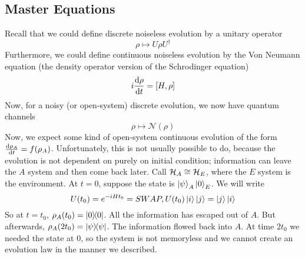 \subsection{Master Equations}
Recall that we could define discrete noiseless evolution by a unitary operator
\[ \rho \mapsto U \rho U^{\dagger} \]
Furthermore, we could define continuous noiseless evolution by the Von Neumann equation (the
density operator version of the Schrodinger equation)
\[ i \dv{\rho}{t} = [H, \rho] \]
Now, for a noisy (or open-system) discrete evolution, we now have quantum channels
\[ \rho \mapsto \mathcal{N}(\rho) \]
Now, we expect some kind of open-system continuous evolution of the form $\dv{\rho_A}{t} = f(\rho_A)$.
Unfortunately, this is not usually possible to do, because the evolution is not dependent on purely on initial condition;
information can leave the $A$ system and then come back later. Call $\operatorname{\mathcal{H}}_A \cong \operatorname{\mathcal{H}}_E$, where the $E$ system
is the environment. At $t = 0$, suppose the state is $\ket{\psi}_A \ket{0}_E$. We will write
\[ U(t_0) = e^{-iHt_0} = SWAP, U(t_0) \ket{i} \ket{j} = \ket{j} \ket{i} \]
So at $t = t_0$, $\rho_A(t_0) = \ketbra{0}$. All the information has escaped out of $A$. But afterwards,
$\rho_A(2 t_0) = \ketbra{\psi}$. The information flowed back into $A$. At time $2t_0$ we needed the state at $0$,
so the system is not memoryless and we cannot create an evolution law in the manner we described.

